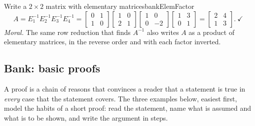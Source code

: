 \documentclass[11pt]{article}
\begin{document}
\begin{exmp}{Write a $2\times2$ matrix with elementary matrices}{bankElemFactor}
\[
A=E_1^{-1}E_2^{-1}E_3^{-1}E_4^{-1}=\begin{bmatrix}0&1\\1&0\end{bmatrix}\begin{bmatrix}1&0\\2&1\end{bmatrix}\begin{bmatrix}1&0\\0&-2\end{bmatrix}\begin{bmatrix}1&3\\0&1\end{bmatrix}=\begin{bmatrix}2&4\\1&3\end{bmatrix}.\ \checkmark
\]
\emph{Moral.} The same row reduction that finds $A^{-1}$ also writes $A$ as a product of elementary matrices, in the reverse order and with each factor inverted.
\end{exmp}

\subsection*{Bank: basic proofs}

A proof is a chain of reasons that convinces a reader that a statement is true in \emph{every} case that the statement covers. The three examples below, easiest first, model the habits of a short proof: read the statement, name what is assumed and what is to be shown, and write the argument in steps.
\end{document}
